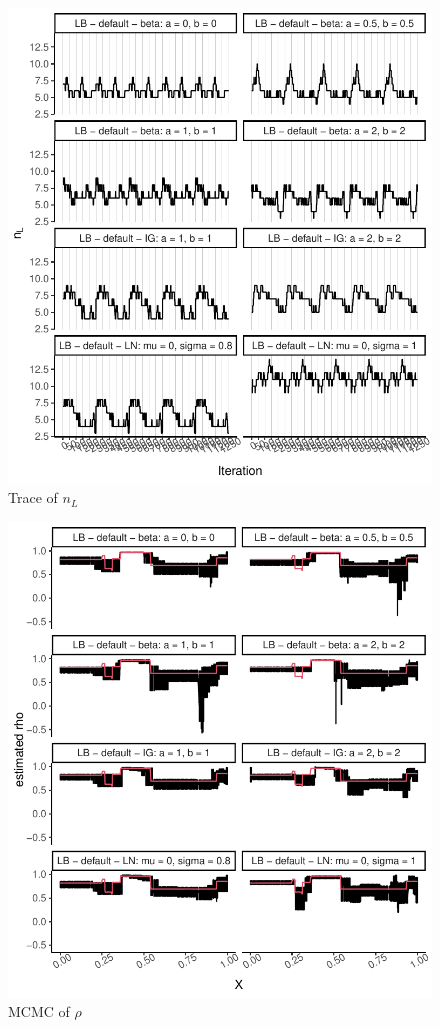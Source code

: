 \documentclass{amsart}
\begin{document}
\begin{figure}[ht]
	\centering
	\includegraphics[width=0.95\linewidth]{trace_nl_1.pdf}
	\caption{Trace of $n_L$}
	\label{fig:trace:nl:1}
\end{figure}
\iffalse
\begin{figure}[ht]
	\centering
	\includegraphics[width=0.95\linewidth]{mcmc_rho_1.pdf}
	\caption{MCMC of $\rho$}
	\label{fig:mcmc:rho:1}
\end{figure}
\end{document}
